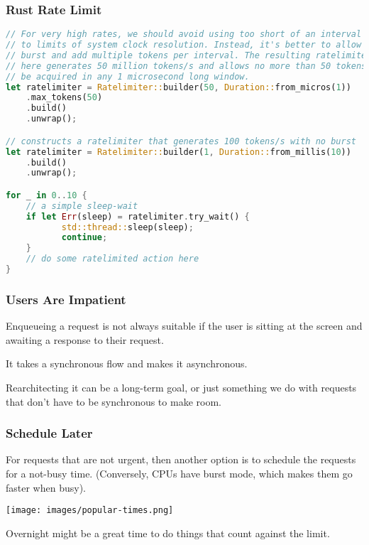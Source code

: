 \begin{frame}[fragile]
\frametitle{Rust Rate Limit}
\begin{lstlisting}[language=Rust]
// For very high rates, we should avoid using too short of an interval due
// to limits of system clock resolution. Instead, it's better to allow some
// burst and add multiple tokens per interval. The resulting ratelimiter
// here generates 50 million tokens/s and allows no more than 50 tokens to
// be acquired in any 1 microsecond long window.
let ratelimiter = Ratelimiter::builder(50, Duration::from_micros(1))
    .max_tokens(50)
    .build()
    .unwrap();

// constructs a ratelimiter that generates 100 tokens/s with no burst
let ratelimiter = Ratelimiter::builder(1, Duration::from_millis(10))
    .build()
    .unwrap();

for _ in 0..10 {
    // a simple sleep-wait
    if let Err(sleep) = ratelimiter.try_wait() {
           std::thread::sleep(sleep);
           continue;
    }
    // do some ratelimited action here    
}
\end{lstlisting}
\end{frame}

\begin{frame}
\frametitle{Users Are Impatient}

Enqueueing a request is not always suitable if the user is sitting at the screen and awaiting a response to their request.

It takes a synchronous flow and makes it asynchronous.

Rearchitecting it can be a long-term goal, or just something we do with requests that don't have to be synchronous to make room.

\end{frame}

\begin{frame}
\frametitle{Schedule Later}

For requests that are not urgent, then another option is to schedule the requests for a not-busy time.
(Conversely, CPUs have burst mode, which makes them go faster when busy).

\begin{center}
  \texttt{[image: images/popular-times.png]}
\end{center}

Overnight might be a great time to do things that count against the limit.

\end{frame}

